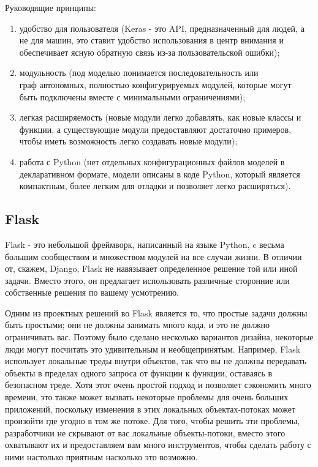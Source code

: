 Руководящие принципы:
\begin{enumerate}
  \item удобство для пользователя (Keras - это API, предназначенный для людей, а не для машин, это ставит удобство использования в центр внимания и обеспечивает ясную обратную связь из-за пользовательской ошибки);
  \item модульность (под моделью понимается последовательность или \\граф автономных, полностью конфигурируемых модулей, которые могут \\быть подключены вместе с минимальными ограничениями);
  \item легкая расширяемость (новые модули легко добавлять, как новые классы и функции, а существующие модули предоставляют достаточно примеров, чтобы иметь возможность легко создавать новые модули);
  \item работа с Python (нет отдельных конфигурационных файлов моделей в декларативном формате, модели описаны в коде Python, который является компактным, более легким для отладки и позволяет легко расширяться).
\end{enumerate}

\subsection{Flask}
\label{sec:development:flask}

Flask - это небольшой фреймворк, написанный на языке Python, c весьма большим сообществом и множеством модулей на все случаи жизни. В отличии от, скажем, Django, Flask не навязывает определенное решение той или иной задачи. Вместо этого, он предлагает использовать различные сторонние или собственные решения по вашему усмотрению.

Одним из проектных решений во Flask является то, что простые задачи должны быть простыми; они не должны занимать много кода, и это не должно ограничивать вас. Поэтому было сделано несколько вариантов дизайна, некоторые люди могут посчитать это удивительным и необщепринятым. Например, Flask использует локальные треды внутри объектов, так что вы не должны передавать объекты в пределах одного запроса от функции к функции, оставаясь в безопасном треде. Хотя этот очень простой подход и позволяет сэкономить много времени, это также может вызвать некоторые проблемы для очень больших приложений, поскольку изменения в этих локальных объектах-потоках может произойти где угодно в том же потоке. Для того, чтобы решить эти проблемы, разработчики не скрывают от вас локальные объекты-потоки, вместо этого охватывают их и предоставляем вам много инструментов, чтобы сделать работу с ними настолько приятным насколько это возможно.

